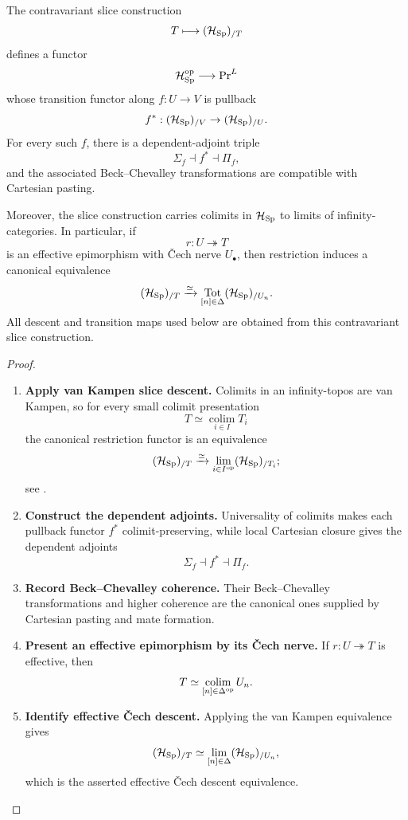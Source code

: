 \begin{theorem}
\label{thm:parameterized-slice-cech-descent}
The contravariant slice construction
\[
  T\longmapsto(\mathcal H_{\operatorname{Sp}})_{/T}
\]
defines a functor
\[
  \mathcal H_{\operatorname{Sp}}^{\mathrm{op}}\longrightarrow\operatorname{Pr}^L
\]
whose transition functor along \(f:U\to V\) is pullback
\[
  f^*:(\mathcal H_{\operatorname{Sp}})_{/V}\to(\mathcal H_{\operatorname{Sp}})_{/U}.
\]
For every such \(f\), there is a dependent-adjoint triple
\[
  \Sigma_f\dashv f^*\dashv\Pi_f,
\]
and the associated Beck--Chevalley transformations are compatible with
Cartesian pasting.

Moreover, the slice construction carries colimits in \(\mathcal H_{\operatorname{Sp}}\) to
limits of infinity-categories. In particular, if
\[
  r:U\twoheadrightarrow T
\]
is an effective epimorphism with \v{C}ech nerve \(U_\bullet\), then restriction
induces a canonical equivalence
\[
  (\mathcal H_{\operatorname{Sp}})_{/T}
  \xrightarrow{\simeq}
  \operatorname*{Tot}_{[n]\in\Delta}
  (\mathcal H_{\operatorname{Sp}})_{/U_n}.
\]
All descent and transition maps used below are obtained from this
contravariant slice construction.
\end{theorem}

\begin{proof}
\leavevmode
\begin{enumerate}[label=\textup{(\arabic*)}]
    \item \textbf{Apply van Kampen slice descent.}
Colimits in an infinity-topos are van Kampen, so for every small colimit
presentation
\[
  T\simeq\operatorname*{colim}_{i\in I}T_i
\]
the canonical restriction functor is an equivalence
\[
  (\mathcal H_{\operatorname{Sp}})_{/T}
  \xrightarrow{\simeq}
  \operatorname*{lim}_{i\in I^{\mathrm{op}}}
  (\mathcal H_{\operatorname{Sp}})_{/T_i};
\]
see \cite[Theorem~6.1.3.9]{LurieHTT}.

    \item \textbf{Construct the dependent adjoints.}
Universality of colimits makes each
pullback functor \(f^*\) colimit-preserving, while local Cartesian closure gives
the dependent adjoints
\[
  \Sigma_f\dashv f^*\dashv\Pi_f.
\]

    \item \textbf{Record Beck--Chevalley coherence.}
Their Beck--Chevalley transformations and higher coherence are the canonical
ones supplied by Cartesian pasting and mate formation.

    \item \textbf{Present an effective epimorphism by its Čech nerve.}
If \(r:U\twoheadrightarrow T\) is effective, then
\[
  T\simeq
  \operatorname*{colim}_{[n]\in\Delta^{\mathrm{op}}}U_n.
\]

    \item \textbf{Identify effective Čech descent.}
Applying the van Kampen equivalence gives
\[
  (\mathcal H_{\operatorname{Sp}})_{/T}
  \simeq
  \operatorname*{lim}_{[n]\in\Delta}
  (\mathcal H_{\operatorname{Sp}})_{/U_n},
\]
which is the asserted effective \v{C}ech descent equivalence.
\end{enumerate}
\end{proof}

